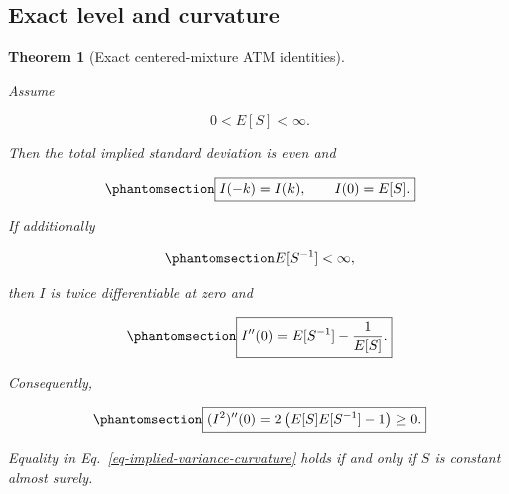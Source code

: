 \documentclass[
  english,
  11pt,
  letterpaper,
  DIV=11,
  numbers=noendperiod]{scrartcl}
\theoremstyle{plain}
\newtheorem{theorem}{Theorem}[section]
\theoremstyle{plain}
\theoremstyle{plain}
\theoremstyle{plain}
\theoremstyle{remark}
\begin{document}
\subsection{Exact level and curvature}\label{exact-level-and-curvature}

\begin{theorem}[Exact centered-mixture ATM
identities]\protect\hypertarget{thm-mixture-smile}{}\label{thm-mixture-smile}

Assume

\[
0<E[S]<\infty.
\]

Then the total implied standard deviation is even and

\begin{equation}\protect\phantomsection\label{eq-mixture-level}{
\boxed{
I(-k)=I(k),\qquad I(0)=E[S].
}
}\end{equation}

If additionally

\begin{equation}\protect\phantomsection\label{eq-inverse-moment}{
E[S^{-1}]<\infty,
}\end{equation}

then \(I\) is twice differentiable at zero and

\begin{equation}\protect\phantomsection\label{eq-mixture-curvature}{
\boxed{
I''(0)=E[S^{-1}]-\frac1{E[S]}.
}
}\end{equation}

Consequently,

\begin{equation}\protect\phantomsection\label{eq-implied-variance-curvature}{
\boxed{
(I^2)''(0)
=2\left(E[S]E[S^{-1}]-1\right)\ge0.
}
}\end{equation}

Equality in Eq.~\ref{eq-implied-variance-curvature} holds if and only if
\(S\) is constant almost surely.

\end{theorem}
\end{document}
